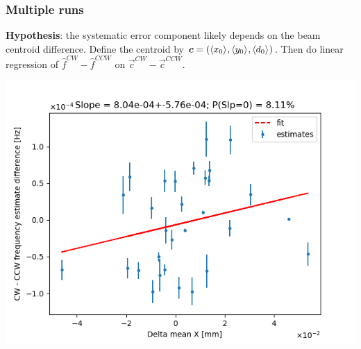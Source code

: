 \documentclass{beamer}
\begin{document}
\begin{frame}
  \frametitle{Multiple runs}
  \textbf{Hypothesis}: the systematic error component likely depends on the beam centroid difference. Define the centroid by $\vec c = (\avg{x_0}, \avg{y_0}, \avg{d_0})$. Then do linear regression of $\hat f^{CW} - \hat f^{CCW}$ on $\vec c^{CW} - \vec c^{CCW}$.
  \begin{center}
    \includegraphics[height=.5\paperheight]{img/spin_axis_motion/multiple/freq_estimates_vs_centroid_diff_X}
  \end{center}
\end{frame}
\end{document}
